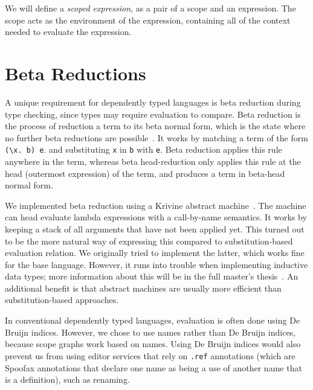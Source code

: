 We will define a \emph{scoped expression}, as a pair of a scope and an expression. The scope acts as the environment of the expression, containing all of the context needed to evaluate the expression.

\section{Beta Reductions}
\label{sec:coc-dynsyms}

A unique requirement for dependently typed languages is beta reduction during type checking, since types may require evaluation to compare. Beta reduction is the process of reduction a term to its beta normal form, which is the state where no further beta reductions are possible~\cite{tapl}. It works by matching a term of the form \verb|(\x. b) e|. and substituting \verb|x| in \verb|b| with \verb|e|. Beta reduction applies this rule anywhere in the term, whereas beta head-reduction only applies this rule at the head (outermost expression) of the term, and produces a term in beta-head normal form.

We implemented beta reduction using a Krivine abstract machine~\cite{krivine}. The machine can head evaluate lambda expressions with a call-by-name semantics. It works by keeping a stack of all arguments that have not been applied yet. This turned out to be the more natural way of expressing this compared to substitution-based evaluation relation. We originally tried to implement the latter, which works fine for the base language. However, it runs into trouble when implementing inductive data types; more information about this will be in the full master's thesis~\cite{thesis}. An additional benefit is that abstract machines are usually more efficient than substitution-based approaches.

In conventional dependently typed languages, evaluation is often done using De Bruijn indices. However, we chose to use names rather than De Bruijn indices, because scope graphs work based on names. Using De Bruijn indices would also prevent us from using editor services that rely on \verb|.ref| annotations (which are Spoofax annotations that declare one name as being a use of another name that is a definition), such as renaming.

